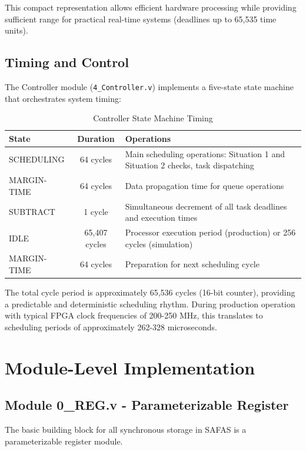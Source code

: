 \documentclass[12pt,a4paper]{article}
\begin{document}
This compact representation allows efficient hardware processing while providing sufficient range for practical real-time systems (deadlines up to 65,535 time units).

\subsection{Timing and Control}

The Controller module (\texttt{4\_Controller.v}) implements a five-state state machine that orchestrates system timing:

\begin{table}[H]
\centering
\begin{tabular}{|l|c|p{6cm}|}
\hline
\textbf{State} & \textbf{Duration} & \textbf{Operations} \\
\hline
SCHEDULING & 64 cycles & Main scheduling operations: Situation 1 and Situation 2 checks, task dispatching \\
\hline
MARGIN-TIME & 64 cycles & Data propagation time for queue operations \\
\hline
SUBTRACT & 1 cycle & Simultaneous decrement of all task deadlines and execution times \\
\hline
IDLE & 65,407 cycles & Processor execution period (production) or 256 cycles (simulation) \\
\hline
MARGIN-TIME & 64 cycles & Preparation for next scheduling cycle \\
\hline
\end{tabular}
\caption{Controller State Machine Timing}
\label{tab:timing}
\end{table}

The total cycle period is approximately 65,536 cycles (16-bit counter), providing a predictable and deterministic scheduling rhythm. During production operation with typical FPGA clock frequencies of 200-250 MHz, this translates to scheduling periods of approximately 262-328 microseconds.

\section{Module-Level Implementation}

\subsection{Module 0\_REG.v - Parameterizable Register}

The basic building block for all synchronous storage in SAFAS is a parameterizable register module.
\end{document}
